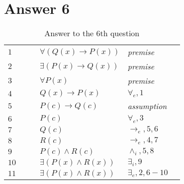 \documentclass[12pt]{article}
\begin{document}
\section*{Answer 6}
\begin{table}[H]
	\centering
	\caption{Answer to the 6th question }
	\begin{tabular}{*6{l}}
		$1$ & & & $\forall(Q(x) \to P(x))$ & \textit{premise} & \\
		$2$ & & & $\exists(P(x) \to Q(x))$ & \textit{premise} & \\

		$3$ & & & $\forall P(x)$ &\textit{premise} &\\

		$4$ & & & $Q(x) \to P(x)$ & $\forall_e,1$ &\\

		

		\hline

		$5$ &  &  & $P(c) \to Q(c)$ &\textit{assumption} &\\
		
		$6$ & & & $P(c)$ & $\forall_e,3$ &\\


		$7$ & & & $Q(c)$ &$\rightarrow_e,5,6$ &\\

		$8$ & & & $R(c)$ & $\rightarrow_e,4,7$ &\\

		$9$ & & & $P(c) \land R(c)$ & $\land_i,5,8$ &\\



		$10$ & & & $\exists(P(x) \land R(x))$ & $\exists _i,9$ & \\

		\hline

		$11$ & & & $\exists(P(x) \land R(x))$ & $\exists _e,2,6-10$ & \\


	\end{tabular}
\end{table}
\end{document}

